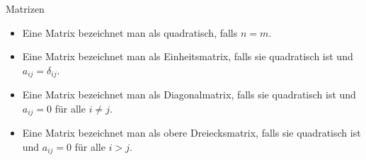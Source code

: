 \documentclass[german]{beamer}
\begin{document}
\begin{frame}{Matrizen}

\begin{itemize}
\item Eine Matrix bezeichnet man als \alert{quadratisch}, falls $n=m$.

\item Eine Matrix bezeichnet man als \alert{Einheitsmatrix}, falls sie quadratisch ist und $a_{ij}=\delta_{ij}$.

\item Eine Matrix bezeichnet man als \alert{Diagonalmatrix}, falls sie quadratisch ist und $a_{ij}=0$ f\"ur alle $i \neq j$.

\item Eine Matrix bezeichnet man als \alert{obere Dreiecksmatrix}, falls sie quadratisch ist und $a_{ij}=0$ f\"ur alle $i>j$.
\end{itemize}

\end{frame}
\end{document}
